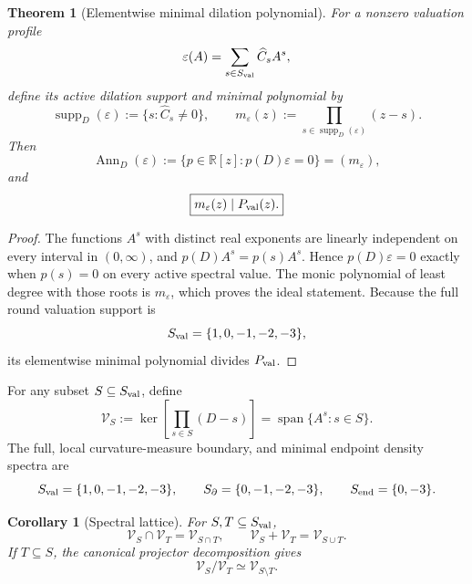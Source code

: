 \documentclass[11pt,a4paper]{article}
\def\Dil{D}%
\numberwithin{equation}{section}
\theoremstyle{definition}
\theoremstyle{plain}
\newtheorem{theorem}[criterion]{Theorem}
\newtheorem{corollary}[criterion]{Corollary}
\theoremstyle{remark}
\newcommand{\Dil}{\mathscr{D}}
\begin{document}
\begin{theorem}[Elementwise minimal dilation polynomial]
For a nonzero valuation profile
\begin{equation}
\varepsilon(A)=\sum_{s\in S_{\rm val}}\widehat C_sA^s,
\end{equation}
define its active dilation support and minimal polynomial by
\begin{equation}
\operatorname{supp}_{\Dil}(\varepsilon)
:=\{s:\widehat C_s\neq0\},
\qquad
m_\varepsilon(z)
:=\prod_{s\in\operatorname{supp}_{\Dil}(\varepsilon)}(z-s).
\end{equation}
Then
\begin{equation}
\boxed{
\operatorname{Ann}_{\Dil}(\varepsilon)
:=\{p\in\mathbb R[z]:p(\Dil)\varepsilon=0\}
=(m_\varepsilon),
}
\end{equation}
and
\begin{equation}
\boxed{m_\varepsilon(z)\mid P_{\rm val}(z).}
\end{equation}
\end{theorem}
\begin{proof}
The functions \(A^s\) with distinct real exponents are linearly independent on every interval in \((0,\infty)\), and \(p(\Dil)A^s=p(s)A^s\). Hence \(p(\Dil)\varepsilon=0\) exactly when \(p(s)=0\) on every active spectral value. The monic polynomial of least degree with those roots is \(m_\varepsilon\), which proves the ideal statement. Because the full round valuation support is
\begin{equation}
S_{\rm val}=\{1,0,-1,-2,-3\},
\end{equation}
its elementwise minimal polynomial divides \(P_{\rm val}\).
\end{proof}

For any subset \(S\subseteq S_{\rm val}\), define
\begin{equation}
\mathcal V_S
:=\ker\!\left[\prod_{s\in S}(\Dil-s)\right]
=\operatorname{span}\{A^s:s\in S\}.
\end{equation}
The full, local curvature-measure boundary, and minimal endpoint density spectra are
\begin{equation}
S_{\rm val}=\{1,0,-1,-2,-3\},
\qquad
S_{\partial}=\{0,-1,-2,-3\},
\qquad
S_{\rm end}=\{0,-3\}.
\end{equation}

\begin{corollary}[Spectral lattice]
For \(S,T\subseteq S_{\rm val}\),
\begin{equation}
\boxed{
\mathcal V_S\cap\mathcal V_T=\mathcal V_{S\cap T},
\qquad
\mathcal V_S+\mathcal V_T=\mathcal V_{S\cup T}.
}
\end{equation}
If \(T\subseteq S\), the canonical projector decomposition gives
\begin{equation}
\boxed{
\mathcal V_S/\mathcal V_T\simeq\mathcal V_{S\setminus T}.
}
\end{equation}
\end{corollary}
\end{document}
